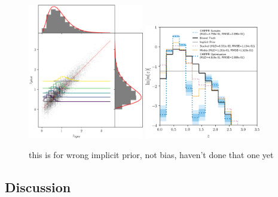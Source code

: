 
\begin{figure}
	\begin{center}
		\includegraphics[width=0.45\textwidth]{figures/chippr/wrong_scatter.png}
		\includegraphics[width=0.45\textwidth]{figures/chippr/wrong_log_estimators.png}
		\caption{this is for wrong implicit prior, not bias, haven't done that one yet}
	\end{center}
\end{figure} 

\subsection{Discussion}

